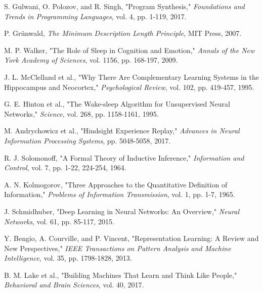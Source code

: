\documentclass[10pt,conference]{IEEEtran}
\begin{document}
\begin{thebibliography}{99}
S. Gulwani, O. Polozov, and R. Singh, "Program Synthesis," \textit{Foundations and Trends in Programming Languages}, vol. 4, pp. 1-119, 2017.

P. Grünwald, \textit{The Minimum Description Length Principle}, MIT Press, 2007.

M. P. Walker, "The Role of Sleep in Cognition and Emotion," \textit{Annals of the New York Academy of Sciences}, vol. 1156, pp. 168-197, 2009.

J. L. McClelland et al., "Why There Are Complementary Learning Systems in the Hippocampus and Neocortex," \textit{Psychological Review}, vol. 102, pp. 419-457, 1995.

G. E. Hinton et al., "The Wake-sleep Algorithm for Unsupervised Neural Networks," \textit{Science}, vol. 268, pp. 1158-1161, 1995.

M. Andrychowicz et al., "Hindsight Experience Replay," \textit{Advances in Neural Information Processing Systems}, pp. 5048-5058, 2017.

R. J. Solomonoff, "A Formal Theory of Inductive Inference," \textit{Information and Control}, vol. 7, pp. 1-22, 224-254, 1964.

A. N. Kolmogorov, "Three Approaches to the Quantitative Definition of Information," \textit{Problems of Information Transmission}, vol. 1, pp. 1-7, 1965.

J. Schmidhuber, "Deep Learning in Neural Networks: An Overview," \textit{Neural Networks}, vol. 61, pp. 85-117, 2015.

Y. Bengio, A. Courville, and P. Vincent, "Representation Learning: A Review and New Perspectives," \textit{IEEE Transactions on Pattern Analysis and Machine Intelligence}, vol. 35, pp. 1798-1828, 2013.

B. M. Lake et al., "Building Machines That Learn and Think Like People," \textit{Behavioral and Brain Sciences}, vol. 40, 2017.

\end{thebibliography}
\end{document}
